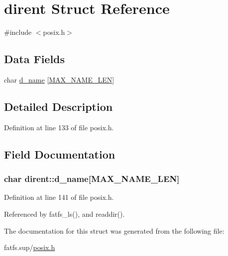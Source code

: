 \hypertarget{structdirent}{}\section{dirent Struct Reference}
\label{structdirent}


{\ttfamily \#include $<$posix.\+h$>$}

\subsection*{Data Fields}
\begin{DoxyCompactItemize}
\item 
char \hyperlink{structdirent_ae61380f3ccbc6c32e8650d7bce76197b}{d\+\_\+name} \mbox{[}\hyperlink{posix_8h_afd709f201d7643c3909621f620ea648a}{M\+A\+X\+\_\+\+N\+A\+M\+E\+\_\+\+L\+EN}\mbox{]}
\end{DoxyCompactItemize}


\subsection{Detailed Description}


Definition at line 133 of file posix.\+h.



\subsection{Field Documentation}
\subsubsection[{\texorpdfstring{d\+\_\+name}{d_name}}]{\setlength{\rightskip}{0pt plus 5cm}char dirent\+::d\+\_\+name\mbox{[}{\bf M\+A\+X\+\_\+\+N\+A\+M\+E\+\_\+\+L\+EN}\mbox{]}}\hypertarget{structdirent_ae61380f3ccbc6c32e8650d7bce76197b}{}\label{structdirent_ae61380f3ccbc6c32e8650d7bce76197b}


Definition at line 141 of file posix.\+h.



Referenced by fatfs\+\_\+ls(), and readdir().



The documentation for this struct was generated from the following file\+:\begin{DoxyCompactItemize}
\item 
fatfs.\+sup/\hyperlink{posix_8h}{posix.\+h}\end{DoxyCompactItemize}
